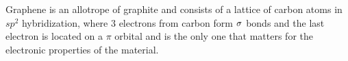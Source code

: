 \documentclass[a4paper,10pt]{article}
\begin{document}
Graphene is an allotrope of graphite and consists of a lattice of carbon atoms in $sp^2$ hybridization, where $3$ electrons from carbon form $\sigma$ bonds and the last electron is located on a $\pi$ orbital and is the only one that matters for the electronic properties of the material.
\end{document}
